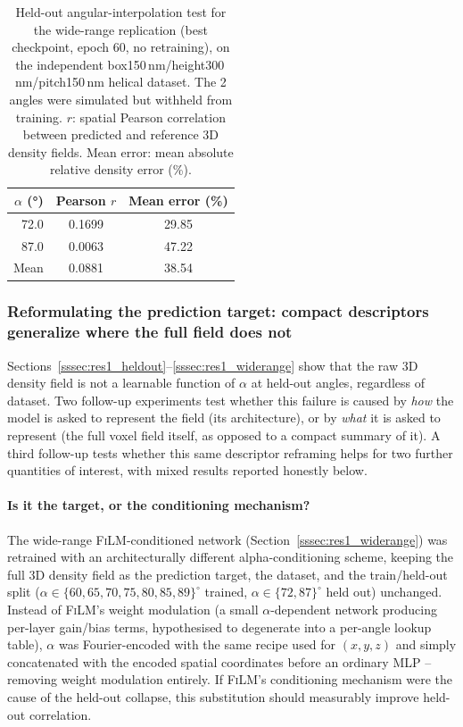 \documentclass[aip,amsmath,amssymb,reprint]{revtex4-1}
\renewcommand{\ang}{\ensuremath{\alpha}} %
\newcommand{\film}{\textsc{FiLM}}
\begin{document}
\begin{table}[htbp]
  \centering
  \caption{%
    Held-out angular-interpolation test for the wide-range replication
    (best checkpoint, epoch 60, no retraining), on the independent
    box150\,nm/height300\,nm/pitch150\,nm helical dataset. The 2 angles
    were simulated but withheld from training. $r$: spatial Pearson
    correlation between predicted and reference 3D density fields.
    Mean error: mean absolute relative density error (\%).
  }
  \label{tab:widerange_heldout}
  \begin{tabular}{rcc}
    \toprule
    $\ang$ (°) & Pearson $r$ & Mean error (\%) \\
    \midrule
    72.0 & 0.1699 & 29.85 \\
    87.0 & 0.0063 & 47.22 \\
    \midrule
    Mean & 0.0881 & 38.54 \\
    \bottomrule
  \end{tabular}
\end{table}

\subsubsection{Reformulating the prediction target: compact descriptors generalize where the full field does not}
\label{sssec:res1_descriptors}

Sections~\ref{sssec:res1_heldout}--\ref{sssec:res1_widerange} show that
the raw 3D density field is not a learnable function of $\ang$ at
held-out angles, regardless of dataset. Two follow-up experiments test
whether this failure is caused by \emph{how} the model is asked to
represent the field (its architecture), or by \emph{what} it is asked
to represent (the full voxel field itself, as opposed to a compact
summary of it). A third follow-up tests whether this same descriptor
reframing helps for two further quantities of interest, with mixed
results reported honestly below.

\paragraph{Is it the target, or the conditioning mechanism?}
The wide-range \film{}-conditioned network (Section~\ref{sssec:res1_widerange})
was retrained with an architecturally different alpha-conditioning
scheme, keeping the full 3D density field as the prediction target,
the dataset, and the train/held-out split ($\ang\in\{60,65,70,75,80,85,89\}^{\circ}$
trained, $\ang\in\{72,87\}^{\circ}$ held out) unchanged. Instead of
\film{}'s weight modulation (a small $\alpha$-dependent network
producing per-layer gain/bias terms, hypothesised to degenerate into a
per-angle lookup table), $\alpha$ was Fourier-encoded with the same
recipe used for $(x,y,z)$ and simply concatenated with the encoded
spatial coordinates before an ordinary MLP -- removing weight
modulation entirely. If \film{}'s conditioning mechanism were the
cause of the held-out collapse, this substitution should measurably
improve held-out correlation.
\end{document}
